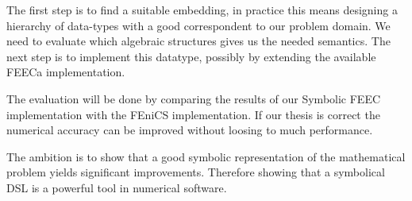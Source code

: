 \documentclass{scrartcl}
\begin{document}



The first step is to find a suitable embedding, in practice this means
designing a hierarchy of data-types with a good correspondent to our problem
domain.  We need to evaluate which algebraic structures gives us the needed
semantics. The next step is to implement this datatype, possibly by extending
the available FEECa implementation.

The evaluation will be done by comparing the results of our Symbolic FEEC
implementation with the FEniCS implementation. If our thesis is correct the
numerical accuracy can be improved without loosing to much performance.




The ambition is to show that a good symbolic representation of the mathematical
problem yields significant improvements. Therefore showing that a symbolical DSL
is a powerful tool in numerical software.










\end{document}
